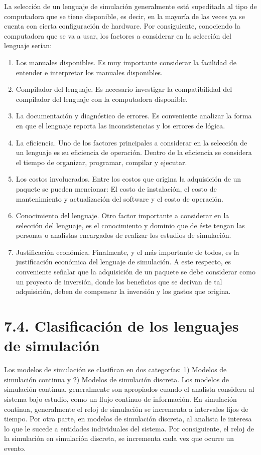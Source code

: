 \documentclass[11pt,letterpaper]{report}
\begin{document}
La selección de un lenguaje de simulación generalmente está supeditada
al tipo de computadora que se tiene disponible, es decir, en la mayoría
de las veces ya se cuenta con cierta configuración de hardware. Por
consiguiente, conociendo la computadora que se va a usar, los factores a
considerar en la selección del lenguaje serían:

\begin{enumerate}[label=\alph*)]
\item Los manuales disponibles. Es muy importante considerar la
facilidad de entender e interpretar los manuales disponibles.
\item Compilador del lenguaje. Es necesario investigar la
compatibilidad del compilador del lenguaje con la computadora
disponible.
\item La documentación y diagnóstico de errores. Es conveniente
analizar la forma en que el lenguaje reporta las inconsistencias y los
errores de lógica.
\item La eficiencia. Uno de los factores principales a considerar en
la selección de un lenguaje es su eficiencia de operación. Dentro de la
eficiencia se considera el tiempo de organizar, programar, compilar y
ejecutar.
\item Los costos involucrados. Entre los costos que origina la
adquisición de un paquete se pueden mencionar: El costo de instalación,
el costo de mantenimiento y actualización del software y el costo de
operación.
\item Conocimiento del lenguaje. Otro factor importante a considerar
en la selección del lenguaje, es el conocimiento y dominio que de éste
tengan las personas o analistas encargados de realizar los estudios de
simulación.
\item Justificación económica. Finalmente, y el más importante de
todos, es la justificación económica del lenguaje de simulación. A este
respecto, es conveniente señalar que la adquisición de un paquete se
debe considerar como un proyecto de inversión, donde los beneficios que
se derivan de tal adquisición, deben de compensar la inversión y los
gastos que origina.
\end{enumerate}

\section*{7.4. Clasificación de los lenguajes de simulación}

Los modelos de simulación se clasifican en dos categorías: 1) Modelos de
simulación continua y 2) Modelos de simulación discreta. Los modelos de
simulación continua, generalmente son apropiados cuando el analista
considera al sistema bajo estudio, como un flujo continuo de
información. En simulación continua, generalmente el reloj de
simulación se incrementa a intervalos fijos de tiempo. Por otra parte,
en modelos de simulación discreta, al analista le interesa lo que le
sucede a entidades individuales del sistema. Por consiguiente, el reloj
de la simulación en simulación discreta, se incrementa cada vez que
ocurre un evento.
\end{document}
